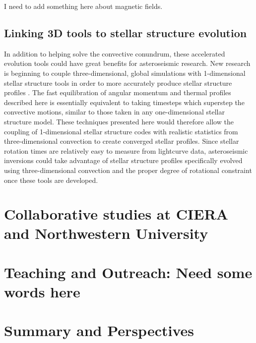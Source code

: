 \documentclass[aasms,12pt]{article}
\begin{document}
I need to add something here about magnetic fields.

\subsection{Linking 3D tools to stellar structure evolution}

In addition to helping solve the convective conundrum, these accelerated evolution tools could have great benefits for asteroseismic research.
New research is beginning to couple three-dimensional, global simulations with 1-dimensional stellar structure tools in order to more accurately produce stellar structure profiles \citep{jorgensen&weiss2019}.
The fast equilibration of angular momentum and thermal profiles described here is essentially equivalent to taking timesteps which superstep the convective motions, similar to those taken in any one-dimensional stellar structure model.
These techniques presented here would therefore allow the coupling of 1-dimensional stellar structure codes with realistic statistics from three-dimensional convection to create converged stellar profiles.
Since stellar rotation times are relatively easy to measure from lightcurve data, asteroseismic inversions could take advantage of stellar structure profiles specifically evolved using three-dimensional convection and the proper degree of rotational constraint once these tools are developed.

\section{Collaborative studies at CIERA and Northwestern University}
\label{sct:northwestern}


\section{Teaching and Outreach: Need some words here}
\label{sct:outreach}


\section{Summary and Perspectives}
\label{sct:summary}



\end{document}
